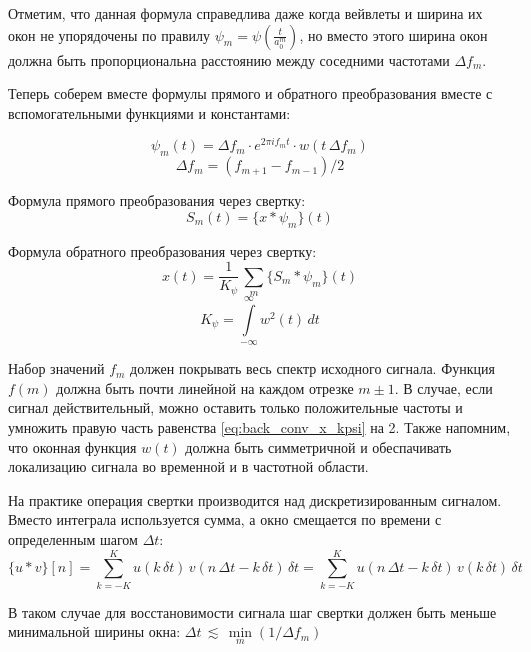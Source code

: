 Отметим, что данная формула справедлива даже когда вейвлеты и ширина их окон не упорядочены по правилу $\psi_m = \psi(\frac{t}{a_0^m})$, 
но вместо этого ширина окон должна быть пропорциональна расстоянию между соседними частотами $\Delta f_m$.

Теперь соберем вместе формулы прямого и обратного преобразования вместе с вспомогательными функциями и константами:

\begin{equation}
  \psi_m(t) = \Delta f_m \cdot e^{2\pi i f_m t} \cdot w(t\,\Delta f_m)
  \label{eq:psi_wavelet_final}
\end{equation}
\begin{equation}
  \Delta f_m = (f_{m+1} - f_{m-1}) / 2
\end{equation}

Формула прямого преобразования через свертку:
\begin{equation}
  S_m(t) = \{x * \psi_m\}(t)
\end{equation}

Формула обратного преобразования через свертку:
\begin{equation}
  x(t) = \frac{1}{K_{\psi}} \, \sum \limits_m \{S_m * \psi_m\}(t)
  \label{eq:back_conv_x_kpsi}
\end{equation}
\begin{equation}
  K_{\psi} = \int \limits_{-\infty}^\infty w^2(t) \, dt
\end{equation}

Набор значений $f_m$ должен покрывать весь спектр исходного сигнала. Функция $f(m)$ должна быть почти линейной на каждом отрезке $m \pm 1$.
В случае, если сигнал действительный, можно оставить только положительные частоты и умножить правую часть равенства \ref{eq:back_conv_x_kpsi} на 2.
Также напомним, что оконная функция $w(t)$ должна быть симметричной и обеспачивать локализацию сигнала во временной и в частотной области.

На практике операция свертки производится над дискретизированным сигналом. Вместо интеграла используется сумма, 
а окно смещается по времени с определенным шагом $\Delta t$:
\begin{equation}
  \{u*v\}[n] = 
  \sum \limits_{ k = -K }^{ K } u( k\,\delta t ) \, v( n\,\Delta t - k\,\delta t ) \, \delta t = 
  \sum \limits_{ k = -K }^{ K } u( n\,\Delta t - k\,\delta t ) \, v( k\,\delta t ) \, \delta t
\end{equation}

В таком случае для восстановимости сигнала шаг свертки должен быть меньше минимальной ширины окна: 
$ \Delta t \, \lesssim \, \min \limits_m (1/\Delta f_m) $


